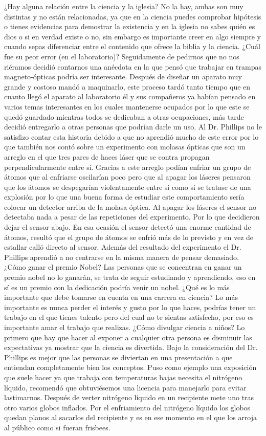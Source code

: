 \documentclass[10pt,letterpaper]{report}
\begin{document}
¿Hay alguna relación entre la ciencia y la iglesia?
No la hay, ambas son muy distintas y no están relacionadas, ya que en la ciencia puedes comprobar hipótesis o tienes evidencias para demostrar la existencia y en la iglesia no sabes quién es dios o si en verdad existe o no, sin embargo es importante creer en algo siempre y cuando sepas diferenciar entre el contenido que ofrece la biblia y la ciencia.
¿Cuál fue su peor error (en el laboratorio)?
Seguidamente de pedirnos que no nos riéramos decidió contarnos una anécdota en la que pensó que trabajar en trampas magneto-ópticas podría ser interesante. Después de diseñar un aparato muy grande y costoso mandó a maquinarlo, este proceso tardó tanto tiempo que en cuanto llegó el aparato al laboratorio él y sus compañeros ya habían pensado en varios temas interesantes en los cuales mantenerse ocupados por lo que este se quedó guardado mientras todos se dedicaban a otras ocupaciones, más tarde decidió entregarlo a otras personas que podrían darle un uso. Al Dr. Phillips no le satisfizo contar esta historia debido a que no aprendió mucho de este error por lo que también nos contó sobre un experimento con molasas ópticas que son un arreglo en el que tres pares de haces láser que se contra propagan perpendicularmente entre sí. Gracias a este arreglo podían enfriar un grupo de átomos que al enfriarse oscilarían poco pero que al apagar los láseres pensaron que los átomos se despegarían violentamente entre sí como si se tratase de una explosión por lo que una buena forma de estudiar este comportamiento sería colocar un detector arriba de la molasa óptica. Al apagar los láseres el sensor no detectaba nada a pesar de las repeticiones del experimento. Por lo que decidieron dejar el sensor abajo. En esa ocasión el sensor detectó una enorme cantidad de átomos, resultó que el grupo de átomos se enfrió más de lo previsto y en vez de estallar calló directo al sensor. Además del resultado del experimento el Dr. Phillips aprendió a no centrarse en la misma manera de pensar demasiado.
¿Cómo ganar el premio Nobel?
Las personas que se concentran en ganar un premio nobel no lo ganarán, se trata de seguir estudiando y aprendiendo, eso en sí es un premio con la dedicación podría venir un nobel.
¿Qué es lo más importante que debe tomarse en cuenta en una carrera en ciencia?
Lo más importante es nunca perder el interés y gusto por lo que haces, podrías tener un trabajo en el que tienes talento pero del cual no te sientas satisfecho, por eso es importante amar el trabajo que realizas. 
¿Cómo divulgar ciencia a niños?
Lo primero que hay que hacer al exponer a cualquier otra persona es disminuir las expectativas ya mostrar que la ciencia es divertida. Bajo la consideración del Dr. Phillips es mejor que las personas se diviertan en una presentación a que entiendan completamente bien los conceptos. Puso como ejemplo una exposición que suele hacer ya que trabaja con temperaturas bajas necesita el nitrógeno líquido, recomendó que obtuviésemos una licencia para manejarlo para evitar lastimarnos. Después de verter nitrógeno líquido en un recipiente mete uno tras otro varios globos inflados. Por el enfriamiento del nitrógeno líquido los globos quedan planos al sacarlos del recipiente y es en ese momento en el que los arroja al público como si fueran frisbees.
\end{document}
